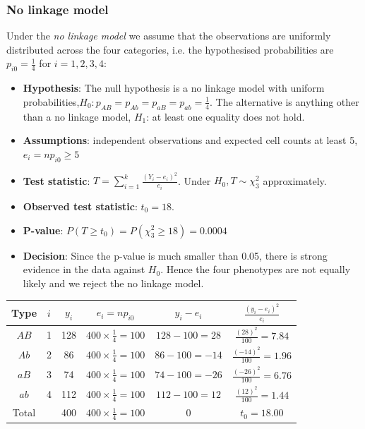 \documentclass[a4paper]{article}\usepackage[]{graphicx}\usepackage[]{xcolor}
\begin{document}
\subsubsection{No linkage model}
Under the \textit{no linkage model} we assume that the observations are uniformly distributed across the four categories, i.e. the hypothesised probabilities are \( p_{i0} = \frac{1}{4} \) for \( i = 1,2,3,4 \):
\begin{itemize}
	\item \textbf{Hypothesis}: The null hypothesis is a no linkage model with uniform probabilities,\( H_0 : p_{AB} = p_{Ab} = p_{aB} = p_{ab} = \frac{1}{4} \). The alternative is anything other than a no linkage model, \( H_1 \): at least one equality does not hold.
	\item \textbf{Assumptions}: independent observations and expected cell counts at least 5, \( e_i = np_{i0} \geq 5 \)
	\item \textbf{Test statistic}: \( T = \sum\limits_{i=1}^{k} \frac{(Y_i - e_i)^2}{e_i} \). Under \( H_0, T \sim \chi^2_3 \) approximately.
	\item \textbf{Observed test statistic}: \( t_0 = 18 \).
	\item \textbf{P-value}: \( P(T\geq t_0) = P(\chi^2_3 \geq 18) =  0.0004 \)
	\item \textbf{Decision}: Since the p-value is much smaller than 0.05, there is strong evidence in the data against \( H_0 \). Hence the four phenotypes are not equally likely and we reject the no linkage model.
\end{itemize}
\begin{table}[H]
	\centering
	\begin{tabular}{@{}cc|cccc@{}}
	Type 	 & \( i \) & \( y_i \) & \( e_i = np_{i0} \) 				& \( y_i - e_i \)      & \( \frac{(y_i - e_i)^2}{e_i} \) \\ \midrule
	\( AB \) & 1 	   & 128  	   & \( 400 \times \frac{1}{4} = 100 \)	& \( 128 - 100 = 28 \) & \( \frac{(28)^2}{100} = 7.84 \)   \\
	\( Ab \) & 2   	   & 86  	   & \( 400 \times \frac{1}{4} = 100 \) & \( 86 - 100 = -14 \) & \( \frac{(-14)^2}{100} = 1.96 \)   \\
	\( aB \) & 3 	   & 74 	   & \( 400 \times \frac{1}{4} = 100 \) & \( 74 - 100 = -26 \) & \( \frac{(-26)^2}{100} = 6.76 \)	 \\
	\( ab \) & 4   	   & 112 	   & \( 400 \times \frac{1}{4} = 100 \) & \( 112 - 100 = 12 \) & \( \frac{(12)^2}{100} = 1.44  \)  \\ \midrule
	Total 	 & 	 	   & 400	   & \( 400 \times \frac{1}{4} = 100 \)	& 0 				   & \( t_0 = 18.00 \) 
	\end{tabular}
\end{table}
\end{document}
